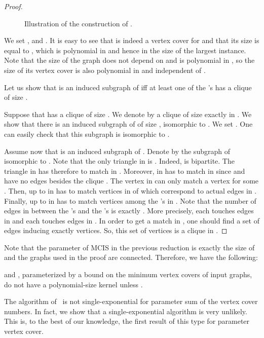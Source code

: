 \begin{proof}
\begin{figure}[ht!]
\begin{tikzpicture}
\end{tikzpicture}
\caption{Illustration of the construction of .}\label{fig:g1}

\end{figure}


We set , and . It is easy to see that  is indeed a vertex cover for  and that its size is equal to , which is polynomial in  and hence in the size of the largest instance. Note that the size of the graph  does not depend on  and is polynomial in , so the size of its vertex cover is also polynomial in  and independent of .

Let us show that  is an induced subgraph of  iff at least one of the 's has a clique of size .

 Suppose that  has a clique of size . We denote by  a clique of size exactly  in . We show that there is an induced subgraph  of  of size , isomorphic to . We set   . One can easily check that this subgraph is isomorphic to .

 Assume now that  is an induced subgraph of . 
Denote by  the subgraph of  isomorphic to . 
Note that the only triangle in  is .
Indeed,  is bipartite.
The triangle  in  has therefore to match  in .
Moreover,  in  has to match  in  since  and  have no edges besides the clique .
The vertex  in  can only match a vertex  for some .
Then,  up to  in  has to match  vertices in    of  which correspond to actual edges in . 
Finally,  up to  in  has to match  vertices among the 's in .
Note that the number of edges in  between the 's and the 's is 
exactly . 
More precisely, each  touches  edges in  and each  touches  edges in .
In order to get a match in , one should find a set of  edges inducing exactly  vertices.
So, this set of  vertices is a clique in .
\end{proof}

Note that the parameter of MCIS in the previous reduction is exactly the size of  and the graphs used in the proof are connected. 
Therefore, we have the following: 

\begin{corollary}
\isi and \mccis, parameterized by a bound on the minimum vertex covers of input graphs, do not have a polynomial-size kernel unless .
\end{corollary}



The algorithm of~\cite{AbuKhzam2014} is not single-exponential for parameter sum of the vertex cover numbers. 
In fact, we show that a single-exponential algorithm is very unlikely.
This is, to the best of our knowledge, the first result of this type for parameter vertex cover.


